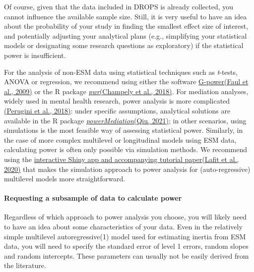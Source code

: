 \documentclass[
]{article}
\begin{document}
Of course, given that the data included in DROPS is already collected,
you cannot influence the available sample size. Still, it is very useful
to have an idea about the probability of your study in finding the
smallest effect size of interest, and potentially adjusting your
analytical plans (e.g., simplifying your statistical models or
designating some research questions as exploratory) if the statistical
power is insufficient.

For the analysis of non-ESM data using statistical techniques such as
\emph{t}-tests, ANOVA or regression, we recommend using either the
software
\href{https://www.psychologie.hhu.de/arbeitsgruppen/allgemeine-psychologie-und-arbeitspsychologie/gpower}{G-power}\href{https://www.zotero.org/google-docs/?wcD7sK}{(Faul
et al., 2009)} or the R package
\href{https://cran.r-project.org/web/packages/pwr/pwr.pdf}{\emph{pwr}}\href{https://www.zotero.org/google-docs/?zgqomC}{(Champely
et al., 2018)}\emph{.} For mediation analyses, widely used in mental
health research, power analysis is more complicated
\href{https://www.zotero.org/google-docs/?ZJP55s}{(Perugini et al.,
2018)}: under specific assumptions, analytical solutions are available
in the R package
\href{https://cran.r-project.org/web/packages/powerMediation/index.html}{\emph{powerMediation}}\href{https://www.zotero.org/google-docs/?dHtGlO}{(Qiu,
2021)}; in other scenarios, using simulations is the most feasible way
of assessing statistical power. Similarly, in the case of more complex
multilevel or longitudinal models using ESM data, calculating power is
often only possible via simulation methods. We recommend using the
\href{https://journals.sagepub.com/doi/full/10.1177/2515245920978738}{interactive
Shiny app and accompanying tutorial
paper}\href{https://www.zotero.org/google-docs/?nap5qJ}{(Lafit et al.,
2020)} that makes the simulation approach to power analysis for
(auto-regressive) multilevel models more straightforward.

\hypertarget{requesting-a-subsample-of-data-to-calculate-power}{%
\paragraph{Requesting a subsample of data to calculate
power}\label{requesting-a-subsample-of-data-to-calculate-power}}

Regardless of which approach to power analysis you choose, you will
likely need to have an idea about some characteristics of your data.
Even in the relatively simple multilevel autoregressive(1) model used
for estimating inertia from ESM data, you will need to specify the
standard error of level 1 errors, random slopes and random intercepts.
These parameters can usually not be easily derived from the literature.
\end{document}
